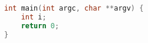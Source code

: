\documentclass[UTF-8]{ctexbook}
\begin{document}
%

\begin{lstlisting}[language=C]
int main(int argc, char **argv) {
    int i;
    return 0;
}
\end{lstlisting}


\end{document}
